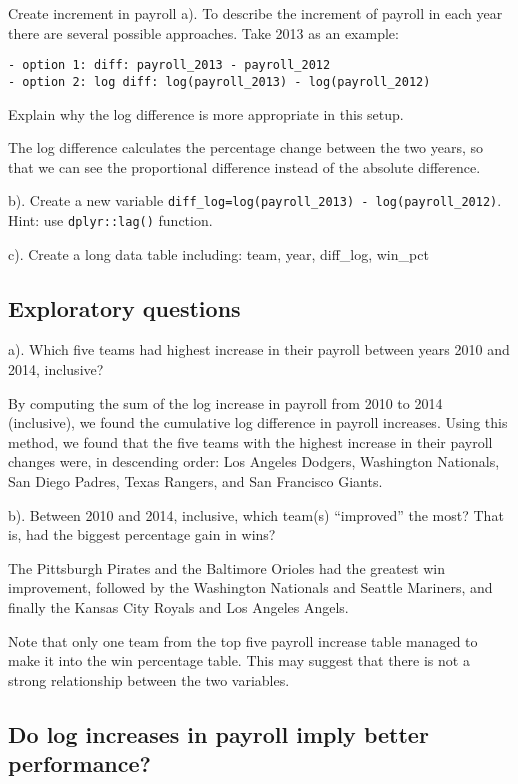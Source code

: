 \documentclass[
]{article}
\begin{document}
Create increment in payroll a). To describe the increment of payroll in
each year there are several possible approaches. Take 2013 as an
example:

\begin{verbatim}
- option 1: diff: payroll_2013 - payroll_2012
- option 2: log diff: log(payroll_2013) - log(payroll_2012)
\end{verbatim}

Explain why the log difference is more appropriate in this setup.

The log difference calculates the percentage change between the two
years, so that we can see the proportional difference instead of the
absolute difference.

b). Create a new variable
\texttt{diff\_log=log(payroll\_2013)\ -\ log(payroll\_2012)}. Hint: use
\texttt{dplyr::lag()} function.

c). Create a long data table including: team, year, diff\_log, win\_pct

\hypertarget{exploratory-questions}{%
\subsection{Exploratory questions}\label{exploratory-questions}}

a). Which five teams had highest increase in their payroll between years
2010 and 2014, inclusive?

By computing the sum of the log increase in payroll from 2010 to 2014
(inclusive), we found the cumulative log difference in payroll
increases. Using this method, we found that the five teams with the
highest increase in their payroll changes were, in descending order: Los
Angeles Dodgers, Washington Nationals, San Diego Padres, Texas Rangers,
and San Francisco Giants.

b). Between 2010 and 2014, inclusive, which team(s) ``improved'' the
most? That is, had the biggest percentage gain in wins?

The Pittsburgh Pirates and the Baltimore Orioles had the greatest win
improvement, followed by the Washington Nationals and Seattle Mariners,
and finally the Kansas City Royals and Los Angeles Angels.

Note that only one team from the top five payroll increase table managed
to make it into the win percentage table. This may suggest that there is
not a strong relationship between the two variables.

\hypertarget{do-log-increases-in-payroll-imply-better-performance}{%
\subsection{Do log increases in payroll imply better
performance?}\label{do-log-increases-in-payroll-imply-better-performance}}
\end{document}
